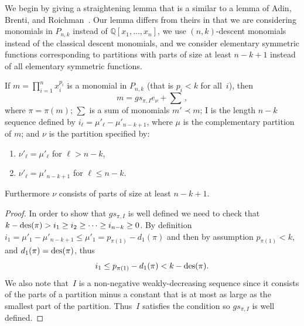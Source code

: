 \documentclass[10pt]{article}
\begin{document}
We begin by giving a straightening lemma that is a similar to a lemma of Adin, Brenti, and Roichman~\cite{ABR}. Our lemma 
differs from theirs in that we are considering monomials in $P_{n,k}$ instead of $\mathbb{Q}[x_1,\ldots, x_n]$, we use 
$(n,k)$-descent monomials instead of the classical descent monomials, and we consider elementary symmetric functions 
corresponding to partitions with parts of size at least $n-k+1$ instead of all elementary symmetric functions.
\begin{lemm}

\label{OrderLem}
If $m=\prod_{i=1}^n x_i^{p_i}$ is a monomial in $P_{n,k}$ \textup{(}that is $p_i<k$ for all~$i$\textup{)}, then 
		\begin{equation}
m=gs_{\pi,I}e_\nu+\sum\,,
\end{equation}
 where $\pi=\pi(m)$; $\sum$ is a sum of monomials $m'\prec m$; I is the length $n-k$ sequence defined by 
$i_\ell=\mu'_{\ell}-\mu'_{n-k+1}$, where $\mu$ is the complementary partition of $m$; and $\nu$ is the partition specified by:

	\begin{enumerate}

		\item $\nu'_\ell=\mu'_\ell$ for $\ell> n-k$,

		\item $\nu'_\ell=\mu'_{n-k+1}$ for $\ell\leq n-k$.
	
	\end{enumerate}

Furthermore $\nu$ consists of parts of size at least $n-k+1$.		

	\begin{proof}
	In order to show that $gs_{\pi,I}$ is well defined we need to check that $k-\operatorname{des} (\pi)>i_1\geq i_2\geq\cdots\geq i_{n-k}\geq 
0$. By definition $i_1=\mu'_1-\mu'_{n-k+1}\leq \mu'_1=p_{\pi(1)}-d_1(\pi)$ and then by assumption $p_{\pi(1)}<k$, and 
$d_1(\pi)=\operatorname{des} (\pi)$, thus 
		\begin{equation}
i_1\leq p_{\pi(1)}-d_1(\pi)<k-\operatorname{des} (\pi).
\end{equation}
	We also note that~$I$ is a non-negative weakly-decreasing sequence since it consists of the parts of a partition minus a 
constant that is at most as large as the smallest part of the partition. Thus~$I$ satisfies the condition so $gs_{\pi,I}$ 
is well defined.
	

\end{proof}
\end{lemm}
\end{document}
